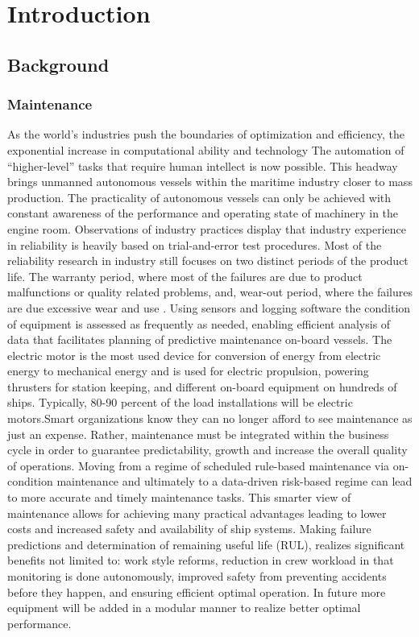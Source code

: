 \section{Introduction}
\label{sec:introduction}
\subsection{Background}
\subsubsection{Maintenance}
As the world’s industries push the boundaries of optimization and efficiency, the exponential increase in computational ability and technology The automation of “higher-level” tasks that require human intellect is now possible. This headway brings unmanned autonomous vessels within the maritime industry closer to mass production. The practicality of autonomous vessels can only be achieved with constant awareness of the performance and operating state of machinery in the engine room. Observations of industry practices display that industry experience in reliability is heavily based on trial-and-error test procedures. Most of the reliability research in industry still focuses on two distinct periods of the product life. The warranty period, where most of the failures are due to product malfunctions or quality related problems, and, wear-out period, where the failures are due excessive wear and use \cite{thomas_warranty_1999}. Using sensors and logging software the condition of equipment is assessed as frequently as needed, enabling efficient analysis of data that facilitates planning of predictive maintenance on-board vessels. The electric motor is the most used device for conversion of energy from electric energy to mechanical energy and is used for electric propulsion, powering thrusters for station keeping, and different on-board equipment on hundreds of ships. Typically, 80-90 percent of the load installations will be electric motors\cite{han_motor_2019}.Smart organizations know they can no longer afford to see maintenance as just an expense. Rather, maintenance must be integrated within the business cycle in order to guarantee predictability, growth and increase the overall quality of operations. Moving from a regime of scheduled rule-based maintenance via on-condition maintenance and ultimately to a data-driven risk-based regime can lead to more accurate and timely maintenance tasks. This smarter view of maintenance allows for achieving many practical advantages leading to lower costs and increased safety and availability of ship systems\cite{han_motor_2019}. 
 Making failure predictions and determination of remaining useful life (RUL), realizes significant benefits not limited to: work style reforms, reduction in crew workload in that monitoring is done autonomously, improved safety from preventing accidents before they happen, and ensuring efficient optimal operation. In future more equipment will be added in a modular manner to realize better optimal performance.  

